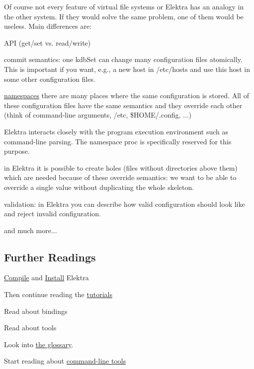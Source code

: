 Of course not every feature of virtual file systems or Elektra has an analogy in the other system. If they would solve the same problem, one of them would be useless. Main differences are\+:


\begin{DoxyItemize}
\item A\+PI (get/set vs. read/write)
\item commit semantics\+: one {\ttfamily kdb\+Set} can change many configuration files atomically. This is important if you want, e.\+g., a new host in {\ttfamily /etc/hosts} and use this host in some other configuration files.
\item \hyperlink{doc_help_elektra-namespaces_md}{namespaces} there are many places where the same configuration is stored. All of these configuration files have the same semantics and they override each other (think of command-\/line arguments, {\ttfamily /etc}, {\ttfamily \$\+H\+O\+ME/.config}, ...)
\item Elektra interacts closely with the program execution environment such as command-\/line parsing. The namespace {\ttfamily proc} is specifically reserved for this purpose.
\item in Elektra it is possible to create holes (files without directories above them) which are needed because of these override semantics\+: we want to be able to override a single value without duplicating the whole skeleton.
\item validation\+: in Elektra you can describe how valid configuration should look like and reject invalid configuration.
\item and much more...
\end{DoxyItemize}

\subsection*{Further Readings}


\begin{DoxyItemize}
\item \hyperlink{doc_COMPILE_md}{Compile} and \hyperlink{doc_INSTALL_md}{Install} Elektra
\item Then continue reading the \hyperlink{md_doc_tutorials_README_doc_tutorials_README_md}{tutorials}
\item Read about bindings
\item Read about tools
\item Look into \hyperlink{doc_help_elektra-glossary_md}{the glossary}.
\item Start reading about \hyperlink{doc_help_kdb_md}{command-\/line tools} 
\end{DoxyItemize}